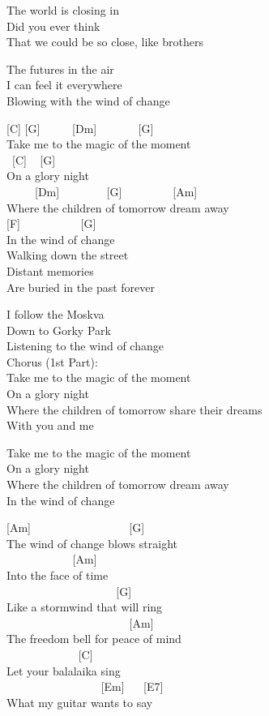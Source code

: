 \documentclass[
  letterpaper,
]{scrbook}
\begin{document}
The world is closing in\\
Did you ever think\\
That we could be so close, like brothers

The future\textquotesingle s in the air\\
I can feel it everywhere\\
Blowing with the wind of change

{[}C{]} {[}G{]} ~ ~ ~ {[}Dm{]} ~ ~ ~ ~ {[}G{]}\\
Take me to the magic of the moment\\
\hspace*{0.333em} ~{[}C{]} ~ {[}G{]}\\
On a glory night\\
\hspace*{0.333em} ~ ~ ~ {[}Dm{]} ~ ~ ~ ~ ~{[}G{]} ~ ~ ~ ~ ~ {[}Am{]}\\
Where the children of tomorrow dream away\\
{[}F{]} ~ ~ ~ ~ ~ ~ {[}G{]}\\
In the wind of change\\
Walking down the street\\
Distant memories\\
Are buried in the past forever

I follow the Moskva\\
Down to Gorky Park\\
Listening to the wind of change\\
Chorus (1st Part):\\
Take me to the magic of the moment\\
On a glory night\\
Where the children of tomorrow share their dreams\\
With you and me

Take me to the magic of the moment\\
On a glory night\\
Where the children of tomorrow dream away\\
In the wind of change

{[}Am{]} ~ ~ ~ ~ ~ ~ ~ ~ ~ ~ {[}G{]}\\
The wind of change blows straight\\
\hspace*{0.333em} ~ ~ ~ ~ ~ ~ ~ {[}Am{]}\\
Into the face of time\\
\hspace*{0.333em} ~ ~ ~ ~ ~ ~ ~ ~ ~ ~ ~ ~{[}G{]}\\
Like a stormwind that will ring\\
\hspace*{0.333em} ~ ~ ~ ~ ~ ~ ~ ~ ~ ~ ~ ~ ~ {[}Am{]}\\
The freedom bell for peace of mind\\
\hspace*{0.333em} ~ ~ ~ ~ ~ ~ ~ ~{[}C{]}\\
Let your balalaika sing\\
\hspace*{0.333em} ~ ~ ~ ~ ~ ~ ~ ~ ~ ~ {[}Em{]} ~ ~{[}E7{]}\\
What my guitar wants to say
\end{document}
